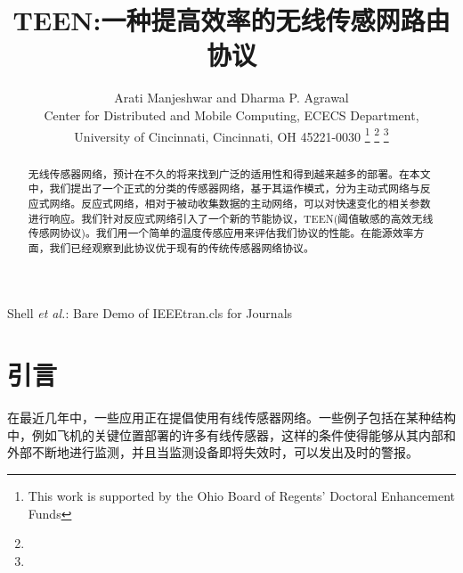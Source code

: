 \documentclass[journal]{IEEEtran}
\renewcommand\thesection{\arabic{section}}
\renewcommand\thesubsection{\thesection.\arabic{subsection}}
\begin{document}
\renewcommand\thesection{\arabic{section}}

\renewcommand\thesubsection{\thesection.\arabic{subsection}}
%
\begin{CJK}{UTF8}{gbsn}

\title{\textbf{TEEN:一种提高效率的无线传感网路由协议}}
%
%
%

\author{Arati Manjeshwar and Dharma P. Agrawal
\\Center for Distributed and Mobile Computing, ECECS Department,
\\University of Cincinnati, Cincinnati, OH 45221-0030
\thanks{This work is supported by the Ohio Board of Regents’ Doctoral Enhancement
Funds}%
\thanks{}%
\thanks{}}

%
{Shell \MakeLowercase{\textit{et al.}}: Bare Demo of IEEEtran.cls for Journals}


\maketitle


\begin{abstract}
无线传感器网络，预计在不久的将来找到广泛的适用性和得到越来越多的部署。在本文中，我们提出了一个正式的分类的传感器网络，基于其运作模式，分为主动式网络与反应式网络。反应式网络，相对于被动收集数据的主动网络，可以对快速变化的相关参数进行响应。我们针对反应式网络引入了一个新的节能协议，TEEN(阈值敏感的高效无线传感网协议)。我们用一个简单的温度传感应用来评估我们协议的性能。在能源效率方面，我们已经观察到此协议优于现有的传统传感器网络协议。
\end{abstract}

\IEEEpeerreviewmaketitle



\section{\textbf{引言}}
在最近几年中，一些应用正在提倡使用有线传感器网络。一些例子包括在某种结构中，例如飞机的关键位置部署的许多有线传感器，这样的条件使得能够从其内部和外部不断地进行监测，并且当监测设备即将失效时，可以发出及时的警报。


\end{CJK}
\end{document}
